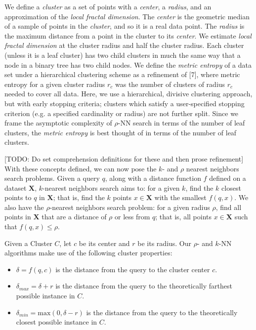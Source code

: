 We define a \emph{cluster} as a set of points with a \emph{center}, a \emph{radius}, and an approximation of the \emph{local fractal dimension}.
The \emph{center} is the geometric median of a sample of points in the \emph{cluster}, and so it is a real data point. The \emph{radius} is the
maximum distance from a point in the cluster to its \emph{center}. We estimate \emph{local fractal dimension} at the cluster radius and half
the cluster radius. Each cluster (unless it is a leaf cluster) has two child clusters in much the same way that a node in
a binary tree has two child nodes. We define the \emph{metric entropy} of a data set under a hierarchical clustering scheme as a refinement of [7], where
metric entropy for a given cluster radius $r_c$ was the number of clusters of radius $r_c$ needed to cover all data. Here, we use a hierarchical, divisive clustering 
approach, but with early stopping criteria; clusters which satisfy a user-specified stopping criterion (e.g. a specified cardinality or radius) are not further split. 
Since we frame the asymptotic complexity of $\rho$-NN search in terms of the number of leaf clusters, the \emph{metric entropy} is best thought of in terms of the number of
leaf clusters. 


[TODO: Do set comprehension definitions for these and then prose refinement]
With these concepts defined, we can now pose the $k$- and $\rho$ nearest neighbors search problems.
Given a query $q$, along with a distance function $f$ defined on a dataset $ \textbf{X}$, $k$-nearest neighbors search aims to: 
for a given $k$, find the $k$ closest points to $q$ in $ \textbf{X}$; that is, find the $k$ points $x \in \textbf{X}$ with the smallest $f(q, x)$.
We also have the $\rho$-nearest neighbors search problem: for a given radius $\rho$, find all points in $\textbf{X}$ that are a distance of $\rho$ 
or less from $q$; that is, all points $x \in \textbf{X}$ such that $f(q, x) \leq \rho$.

Given a Cluster $C$, let $c$ be its center and $r$ be its radius. Our $\rho$- and $k$-NN algorithms make use of the following cluster 
properties:
\begin{itemize}
    \item $\delta = f(q, c)$ is the distance from the query to the cluster center $c$.
    \item $\delta_{max} = \delta + r$ is the distance from the query to the theoretically farthest possible instance in $C$.
    \item $\delta_{min} = \text{max}(0, \delta - r)$ is the distance from the query to the theoretically closest possible instance in $C$.
\end{itemize}


